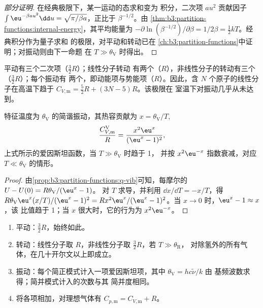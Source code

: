 \begin{proof}[部分证明]
在经典极限下，某一运动的态求和变为
积分，二次项 $a u^2$ 贡献因子 $\int\eu^{-\beta au^2}\dd u =
\sqrt{\pi/\beta a}$，正比于 $\beta^{-1/2}$。由
\cref{thm:b3:partition-functions:internal-energy}，其平均能量为
$-\partial\ln(\beta^{-1/2})/\partial\beta = 1/2\beta = \frac12kT$。经典积分作为量子求和
的极限，对平动和转动已在
\cref{ch:b3:partition-functions}中证明；对振动则由下一命题
在 $T \gg \theta_{\mathrm V}$ 时得出。
\end{proof}

平动有三个二次项（$\frac32R$）；线性分子转动
有两个（$R$），非线性分子的转动有三个（$\frac32R$）；每个振动有
两个，即动能项与势能项（$R$）。因此，含 $N$ 个原子的线性分子在高温下趋于
$C_{V,\mathrm m} = \frac52R + (3N - 5)R$。该极限在
室温下对振动几乎从未达到。

\begin{proposition}[振动热容]\label{prop:b3:statistical-thermo-applied:cv-vib}
特征温度为 $\theta_{\mathrm V}$ 的简谐振动，其热容贡献为
$x = \theta_{\mathrm V}/T$,
\[
  \frac{C_{V,\mathrm m}^{\mathrm V}}{R} = \frac{x^2\eu^x}{(\eu^x - 1)^2},
\]
上式所示的爱因斯坦函数，当 $T \gg \theta_{\mathrm V}$ 时趋于 1，
并按 $x^2\eu^{-x}$ 指数衰减，对应 $T \ll \theta_{\mathrm V}$ 的情形。
\end{proposition}

\begin{proof}
由\cref{prop:b3:partition-functions:q-vib}可知，每摩尔的 $U - U(0) = R\theta_{\mathrm V}/(\eu^x - 1)$。
对 $T$ 求导，并利用 $\dd x/\dd T = -x/T$，得
$R\theta_{\mathrm V}\eu^x(x/T)/(\eu^x - 1)^2 = Rx^2\eu^x/(\eu^x - 1)^2$。当 $x \to 0$ 时，$\eu^x - 1 \approx x$，该
比值趋于 1；当 $x$ 很大时，它的行为为 $x^2\eu^{-x}$。
\end{proof}

\begin{method}[由简正模式求气体的热容]\label{met:b3:statistical-thermo-applied:cv}
\begin{enumerate}
  \item 平动：$\frac32R$，始终如此。
  \item 转动：线性分子取 $R$，非线性分子取 $\frac32R$，若 $T \gg \theta_{\mathrm R}$，
        对除氢外的所有气体，在几十开尔文以上即成立。
  \item 振动：每个简正模式计入一项爱因斯坦项，其中 $\theta_{\mathrm V} = hc\tilde\nu/k$ 由
        基频波数求得；简并模式计入的次数与其
        简并度相同。
  \item 将各项相加，对理想气体有 $C_{p,\mathrm m} = C_{V,\mathrm m} + R$。
\end{enumerate}
\end{method}

